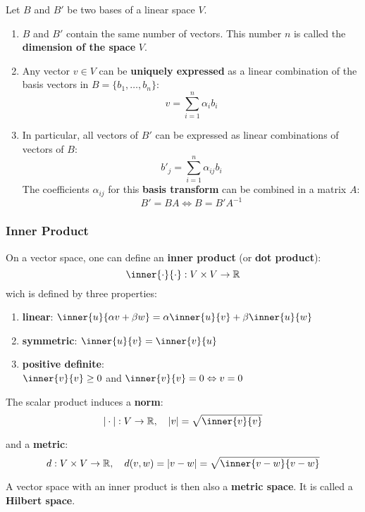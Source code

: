 Let $B$ and $B'$ be two bases of a linear space $V$.

\begin{enumerate}
	\item $B$ and $B'$ contain the same number of vectors.
	This number $n$ is called the \textbf{dimension of the space} $V$.

\item Any vector $v \in V$ can be \textbf{uniquely expressed}
	as a linear combination of the basis vectors in
	$B = \{b_1, \hdots, b_n\}$:
	\[
		v = \sum_{i=1}^n \alpha_i b_i
	\]
	\item In particular, all vectors of $B'$ can be expressed as
	linear combinations of vectors of $B$:
	\[
		b'_j = \sum_{i=1}^n \alpha_{ij} b_i
	\]
	The coefficients $\alpha_{ij}$ for this \textbf{basis transform}
	can be combined in a matrix $A$:
	\[
		B' = BA \Leftrightarrow B = B'A^{-1}
	\]
\end{enumerate}


\subsubsection{Inner Product}%
\label{ssub:inner_product}

On a vector space, one can define an \textbf{inner product}
(or \textbf{dot product}):
\[\inner{\cdot}{\cdot} : V \times V \rightarrow \R\]
wich is defined by three properties:
\begin{enumerate}
	\item \textbf{linear}:
		$\inner{u}{\alpha v + \beta w} = \alpha \inner{u}{v} + \beta \inner{u}{w}$

	\item \textbf{symmetric}:
		$\inner{u}{v} = \inner{v}{u}$

	\item \textbf{positive definite}:\\
		$\inner{v}{v} \geq 0$ and $\inner{v}{v} = 0 \Leftrightarrow v = 0$
	
\end{enumerate}

The scalar product induces a \textbf{norm}:
\[|\cdot| : V \rightarrow \R, \quad |v| = \sqrt{\inner{v}{v}}\]

and a \textbf{metric}:
\[d : V \times V \rightarrow \R, \quad d(v,w) = |v - w| = \sqrt{\inner{v-w}{v-w}}\]

A vector space with an inner product is then also
a \textbf{metric space}. It is called a \textbf{Hilbert space}.


